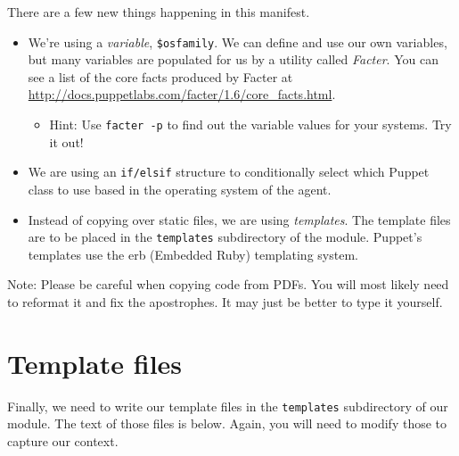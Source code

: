 \documentclass{article}   	%
\begin{document}

There are a few new things happening in this manifest.
\begin{itemize}
  \item We're using a \emph{variable}, \texttt{\$osfamily}.  We can define and use our own variables, but many variables are populated for us by a utility called \emph{Facter}.  You can see a list of the core facts produced by Facter at \\ 
  \url{http://docs.puppetlabs.com/facter/1.6/core_facts.html}.
  \begin{itemize}
  \item Hint: Use {\tt facter -p} to find out the variable values for your systems. Try it out!
  \end{itemize}
  \item We are using an \texttt{if/elsif} structure to conditionally select which Puppet class to use based in the operating system of the agent.
  \item Instead of copying over static files, we are using \emph{templates}.  The template files are to be placed in the \texttt{templates} subdirectory of the module.  Puppet's templates use the erb (Embedded Ruby) templating system.
\end{itemize}

Note: Please be careful when copying code from PDFs. You will most likely need to reformat it and fix the apostrophes. It may just be better to type it yourself.







\section{Template files}
Finally, we need to write our template files in the \texttt{templates} subdirectory of our module.  The text of those files is below. Again, you will need to modify those to capture our context.
\end{document}

